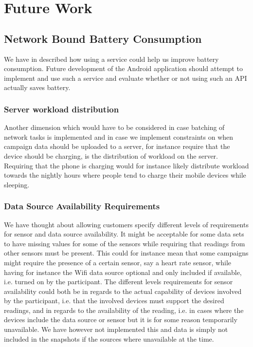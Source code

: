 
\chapter{Future Work}


\section{Network Bound Battery Consumption}
\label{sec:future_work_network_bound_battery_consumption}

We have in  described how using a  service could help us improve battery consumption. Future development of the Android application should attempt to implement and use such a service and evaluate whether or not using such an API actually saves battery.

\subsection{Server workload distribution}

Another dimension which would have to be considered in case batching of network tasks is implemented and in case we implement constraints on when campaign data should be uploaded to a server, for instance require that the device should be charging, is the distribution of workload on the server. Requiring that the phone is charging would for instance likely distribute workload towards the nightly hours where people tend to charge their mobile devices while sleeping.  

\subsection{Data Source Availability Requirements}

We have thought about allowing customers specify different levels of requirements for sensor and data source availability. It might be acceptable for some data sets to have missing values for some of the sensors while requiring that readings from other sensors must be present. This could for instance mean that some campaigns might require the presence of a certain sensor, say a heart rate sensor, while having for instance the Wifi data source optional and only included if available, i.e. turned on by the participant. The different levels requirements for sensor availability could both be in regards to the actual capability of devices involved by the participant, i.e. that the involved devices must support the desired readings, and in regards to the availability of the reading, i.e. in cases where the devices include the data source or sensor but it is for some reason temporarily unavailable. We have however not implemented this and data is simply not included in the snapshots if the sources where unavailable at the time.